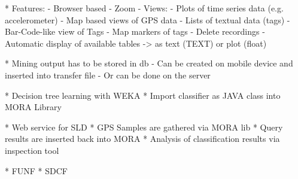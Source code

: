 \documentclass[times, 10pt,twocolumn]{article}
\begin{document}
* Features:
  - Browser based
  - Zoom
  - Views:
    - Plots of time series data (e.g. accelerometer)
    - Map based views of GPS data
    - Lists of textual data (tags)
    - Bar-Code-like view of Tags
    - Map markers of tags
  - Delete recordings
  - Automatic display of available tables
    -> as text (TEXT) or plot (float)

* Mining output has to be stored in db
  - Can be created on mobile device and inserted into transfer file
  - Or can be done on the server


* Decision tree learning with WEKA
* Import classifier as JAVA class into MORA Library

* Web service for SLD
* GPS Samples are gathered via MORA lib
* Query results are inserted back into MORA
* Analysis of classification results via inspection tool


* FUNF
* SDCF


\nocite{ex1,ex2}


\end{document}
